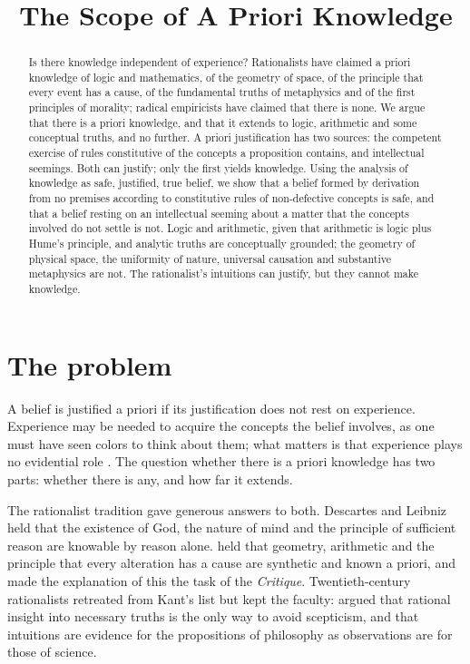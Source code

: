 \documentclass{situationist-preprint}
\title{The Scope of A Priori Knowledge}
\begin{document}
\maketitle

\begin{abstract}
Is there knowledge independent of experience? Rationalists have claimed a priori knowledge of logic and mathematics, of the geometry of space, of the principle that every event has a cause, of the fundamental truths of metaphysics and of the first principles of morality; radical empiricists have claimed that there is none. We argue that there is a priori knowledge, and that it extends to logic, arithmetic and some conceptual truths, and no further. A priori justification has two sources: the competent exercise of rules constitutive of the concepts a proposition contains, and intellectual seemings. Both can justify; only the first yields knowledge. Using the analysis of knowledge as safe, justified, true belief, we show that a belief formed by derivation from no premises according to constitutive rules of non-defective concepts is safe, and that a belief resting on an intellectual seeming about a matter that the concepts involved do not settle is not. Logic and arithmetic, given that arithmetic is logic plus Hume's principle, and analytic truths are conceptually grounded; the geometry of physical space, the uniformity of nature, universal causation and substantive metaphysics are not. The rationalist's intuitions can justify, but they cannot make knowledge.
\end{abstract}

\section{The problem}

A belief is justified a priori if its justification does not rest on experience. Experience may be needed to acquire the concepts the belief involves, as one must have seen colors to think about them; what matters is that experience plays no evidential role \citep{Kitcher1980,Burge1993}. The question whether there is a priori knowledge has two parts: whether there is any, and how far it extends.

The rationalist tradition gave generous answers to both. Descartes and Leibniz held that the existence of God, the nature of mind and the principle of sufficient reason are knowable by reason alone. \citet{Kant1787} held that geometry, arithmetic and the principle that every alteration has a cause are synthetic and known a priori, and made the explanation of this the task of the \emph{Critique}. Twentieth-century rationalists retreated from Kant's list but kept the faculty: \citet{BonJour1998} argued that rational insight into necessary truths is the only way to avoid scepticism, and \citet{Bealer1998} that intuitions are evidence for the propositions of philosophy as observations are for those of science.
\end{document}
